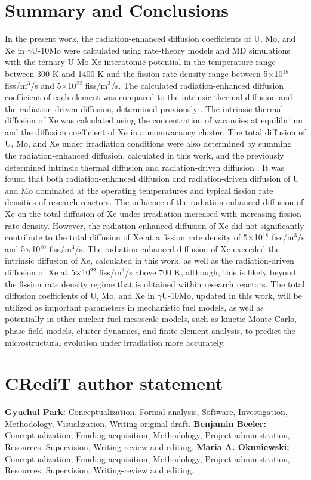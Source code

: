 \documentclass[preprint,12pt]{elsarticle}
\begin{document}
\section{Summary and Conclusions}
In the present work, the radiation-enhanced diffusion coefficients of U, Mo, and Xe in $\gamma$U-10Mo were calculated using rate-theory models and MD simulations with the ternary U-Mo-Xe interatomic potential \cite{smirnova2013ternary} in the temperature range between 300 K and 1400 K and the fission rate density range between 5$\times$10$^{18}$ fiss/m$^{3}$/s and 5$\times$10$^{22}$ fiss/m$^{3}$/s. The calculated radiation-enhanced diffusion coefficient of each element was compared to the intrinsic thermal diffusion and the radiation-driven diffusion, determined previously  \cite{beeler2021radiation, huang2013}. The intrinsic thermal diffusion of Xe was calculated using the concentration of vacancies at equilibrium and the diffusion coefficient of Xe in a monovacancy cluster. The total diffusion of U, Mo, and Xe under irradiation conditions were also determined by summing the radiation-enhanced diffusion, calculated in this work, and the previously determined intrinsic thermal diffusion and radiation-driven diffusion \cite{beeler2021radiation, huang2013}. It was found that both radiation-enhanced diffusion and radiation-driven diffusion of U and Mo dominated at the operating temperatures and typical fission rate densities of research reactors. The influence of the radiation-enhanced diffusion of Xe on the total diffusion of Xe under irradiation increased with increasing fission rate density. However, the radiation-enhanced diffusion of Xe did not significantly contribute to the total diffusion of Xe at a fission rate density of 5$\times$10$^{18}$ fiss/m$^{3}$/s and 5$\times$10$^{20}$ fiss/m$^{3}$/s. The radiation-enhanced diffusion of Xe exceeded the intrinsic diffusion of Xe, calculated in this work, as well as the radiation-driven diffusion of Xe at 5$\times$10$^{22}$ fiss/m$^{3}$/s above 700 K, although, this is likely beyond the fission rate density regime that is obtained within research reactors. The total diffusion coefficients of U, Mo, and Xe in $\gamma$U-10Mo, updated in this work, will be utilized as important parameters in mechanistic fuel models, as well as potentially in other nuclear fuel  mesoscale models, such as kinetic Monte Carlo, phase-field models, cluster dynamics, and finite element analysis, to predict the microstructural evolution under irradiation more accurately. 

\section{CRediT author statement}
\textbf{Gyuchul Park:} Conceptualization, Formal analysis, Software, Investigation, Methodology, Visualization, Writing-original draft. \textbf{Benjamin Beeler:} Conceptualization, Funding acquisition, Methodology,  Project administration, Resources, Supervision, Writing-review and editing. \textbf{Maria A. Okuniewski:} Conceptualization, Funding acquisition, Methodology, Project administration, Resources, Supervision, Writing-review and editing.
\end{document}
